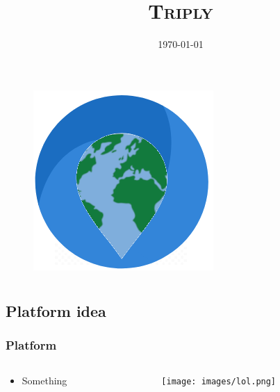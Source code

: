 \documentclass[aspectratio=43, fleqn]{beamer}
\title[Triply]{\LARGE{\textsc{Triply}}}
\author[Azhel Uladzislau, Bortolotti Samuele, Petrosyan Vahan, Sassetti Gianluca, Stolin Marcel]{
    \usebox{\authbox}
}
\institute[University of Trento]{\textrm{University of Trento}}
\date{\textrm{\today}}
\begin{document}
\begin{frame}
    \titlepage
    \begin{figure}[htpb]
        \begin{center}
            \vspace{-0.5cm}
            \includegraphics[width=0.16\linewidth]{logo.png}
        \end{center}
    \end{figure}
\end{frame}

\section[Platform]{}
\subsection{Platform idea}
\begin{frame}
\frametitle{Platform}
\begin{columns} 
    \begin{column}{.4\textwidth}
    \vspace{-1.5cm}
    \begin{itemize}
        \item Something
    \end{itemize}
    \end{column}
    \begin{column}{.6\textwidth}
        \vspace{-0.8cm}
        \begin{center}
            \texttt{[image: images/lol.png]}
        \end{center}
    \end{column}
\end{columns}
\end{frame}

\section[Market and competition]{}
\end{document}
